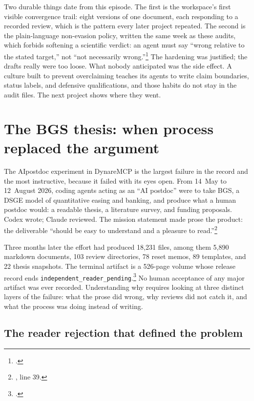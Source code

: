 Two durable things date from this episode. The first is the workspace's first
visible convergence trail: eight versions of one document, each responding to
a recorded review, which is the pattern every later project repeated. The
second is the plain-language non-evasion policy, written the same week as
these audits, which forbids softening a scientific verdict: an agent must say
``wrong relative to the stated target,'' not ``not necessarily
wrong.''\footnote{.}
The hardening was justified; the drafts really were too loose. What nobody
anticipated was the side effect. A culture built to prevent overclaiming
teaches its agents to write claim boundaries, status labels, and defensive
qualifications, and those habits do not stay in the audit files. The next
project shows where they went.

\section{The BGS thesis: when process replaced the argument}
\label{sec:bgs}

The AIpostdoc experiment in DynareMCP is the largest failure in the record and
the most instructive, because it failed with its eyes open. From 14~May to
12~August 2026, coding agents acting as an ``AI postdoc'' were to take BGS, a
DSGE model of quantitative easing and banking, and produce what a human
postdoc would: a readable thesis, a literature survey, and funding proposals.
Codex wrote; Claude reviewed. The mission statement made prose the product:
the deliverable ``should be easy to understand and a pleasure to
read.''\footnote{, line 39.}

Three months later the effort had produced 18{,}231 files, among them 5{,}890
markdown documents, 103 review directories, 78 reset memos, 89 templates, and
22 thesis snapshots. The terminal artifact is a 526-page volume whose release
record ends \texttt{independent\_reader\_pending}.\footnote{.}
No human acceptance of any major artifact was ever recorded. Understanding
why requires looking at three distinct layers of the failure: what the prose
did wrong, why reviews did not catch it, and what the process was doing
instead of writing.

\subsection{The reader rejection that defined the problem}
\label{sec:bgs-rejection}

